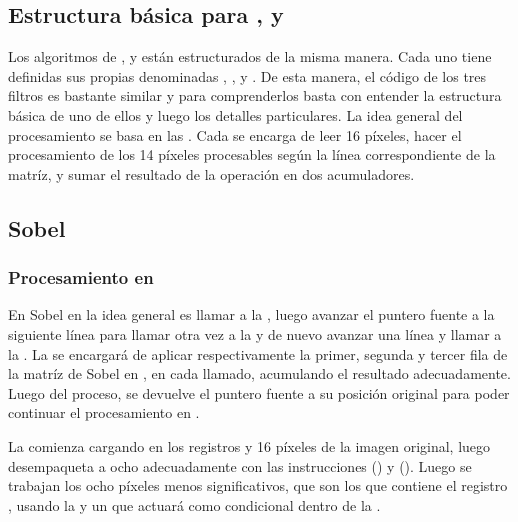 \vspace{1cm}

\subsection{Estructura básica para ,  y }
	Los algoritmos de ,  y  están estructurados de la misma manera. Cada uno tiene definidas sus 
propias  denominadas , ,  y . De esta manera, el código de los tres 
filtros es bastante similar y para comprenderlos basta con entender la estructura básica de uno de ellos y luego los detalles particulares. La idea general 
del procesamiento se basa en las  . Cada  se encarga de leer 16 píxeles, hacer el procesamiento de los
14 píxeles procesables según la línea correspondiente de la matríz, y sumar el resultado de la operación en dos acumuladores.

\subsection{Sobel}

\subsubsection{Procesamiento en }
	En Sobel en  la idea general es llamar a la  , luego avanzar el puntero fuente a la siguiente línea 
para llamar otra vez a la  y de nuevo avanzar una línea y llamar a la . La  se encargará de aplicar 
respectivamente la primer, segunda y tercer fila de la matríz de Sobel en , en cada llamado, acumulando el resultado adecuadamente. Luego del 
proceso, se devuelve el puntero fuente a su posición original para poder continuar el procesamiento en .

	La   comienza cargando en los registros  y  16 píxeles de la imagen original, luego desempaqueta 
a ocho  adecuadamente con las instrucciones  () y  (). Luego se trabajan los ocho píxeles menos significativos, que son los que contiene el registro , usando la   y un 
  que actuará como condicional dentro de la . 

